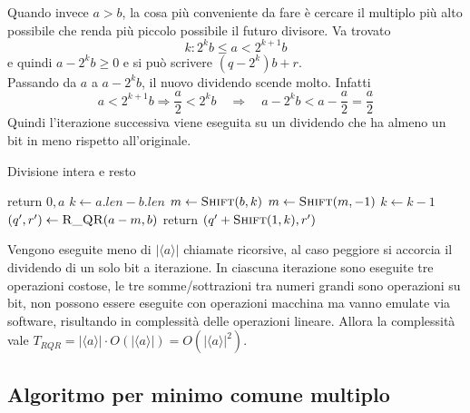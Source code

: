 Quando invece $a > b$, la cosa più conveniente da fare è cercare il multiplo più alto possibile che renda più piccolo possibile il futuro divisore.
Va trovato
\begin{equation*}
    k:
    2^k b
    \leq
    a < 2^{k+1} b
\end{equation*}
e quindi 
$
a - 2^k b \geq 0 
$
e si può scrivere
$
\left( q - 2^k \right) b + r
$.
\\
Passando da $a$ a $
a - 2^k b
$, il nuovo dividendo scende molto.
Infatti
\begin{equation*}
    a < 2^{k+1} b
    \Rightarrow
    \frac{a}{2}
    < 2^{k} b
    \quad
    \Rightarrow
    \quad
    a - 2^k b < a -
    \frac{a}{2}
    = 
    \frac{a}{2}
\end{equation*}
Quindi l'iterazione successiva viene eseguita su un dividendo che ha almeno un bit in meno rispetto all'originale.
\begin{algorithm}[H]
\caption{Divisione intera e resto}\label{alg:divisione_resto}
\begin{algorithmic}[1]
            \State return $0, a$
        \EndIf
        \State $k \gets a.len - b.len$
        \State $m \gets \Call{Shift}{b, k}$
            \State $m \gets \Call{Shift}{m, -1}$
            \State $k \gets k-1$
        \EndIf
        \State $\left( q', r' \right) \gets \Call{R\_QR}{a-m, b}$
        \State return $
        \left( 
            q' + \Call{Shift}{1, k}, r'
        \right)
        $
    \EndProcedure
\end{algorithmic}
\end{algorithm}
\noindent
Vengono eseguite meno di $
| \langle a \rangle |
$ chiamate ricorsive, al caso peggiore si accorcia il dividendo di un solo bit a iterazione.
In ciascuna iterazione sono eseguite tre operazioni costose, le tre somme/sottrazioni tra numeri grandi sono operazioni su bit, non possono essere eseguite con operazioni macchina ma vanno emulate via software, risultando in complessità delle operazioni lineare.
Allora la complessità vale $
T_{RQR} = 
| \langle a \rangle |
\cdot
O \left( 
    | \langle a \rangle |
\right)
=
O \left( 
    | \langle a \rangle |^2
\right)
$.

\subsection{Algoritmo per minimo comune multiplo}

